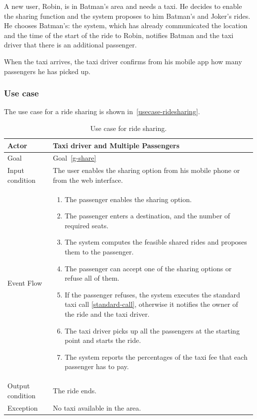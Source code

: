 A new user, Robin, is in Batman's area and needs a taxi. He decides to enable the sharing function and the system proposes to him Batman's and Joker's rides.
He chooses Batman's: the system, which has already communicated the location and the time of the start of the ride to Robin, notifies Batman and the taxi driver that there is an additional passenger.

When the taxi arrives, the taxi driver confirms from his mobile app how many passengers he has picked up.

\subsubsection{Use case}
The use case for a ride sharing is shown in~\autoref{usecase-ridesharing}.

\begin{table}
\begin{center}
\begin{tabular}{| l | p{} |}
\hline
Actor & Taxi driver and Multiple Passengers \\
\hline
Goal & Goal~\ref{g-share}
\\
\hline
Input condition & The user enables the sharing option from his mobile phone or from the web interface.  \\
\hline
Event Flow &
\begin{enumerate}
	\item The passenger enables the sharing option.
	\item The passenger enters a destination, and the number of required seats.
	\item The system computes the feasible shared rides and proposes them to the passenger.
	\item The passenger can accept one of the sharing options or refuse all of them.
	\item If the passenger refuses, the system executes the standard taxi call \ref{standard-call}, otherwise it notifies the owner of the ride and the taxi driver.
	\item The taxi driver picks up all the passengers at the starting point and starts the ride.
	\item The system reports the percentages of the taxi fee that each passenger has to pay.
\end{enumerate}
\\
\hline
Output condition & The ride ends. \\
\hline
Exception & No taxi available in the area. \\
\hline
\end{tabular}
\end{center}
\caption{Use case for ride sharing.}
\label{usecase-ridesharing}
\end{table}

